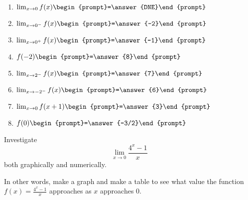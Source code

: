 \documentclass[handout]{ximera}
\begin{document}
\begin{question}
\begin{enumerate}
\item $\lim_{x\to 0} f(x) \begin{prompt}=\answer{DNE}\end{prompt}$ 
\item $\lim_{x\to 0^-} f(x) \begin{prompt}=\answer{-2}\end{prompt}$  
\item $\lim_{x\to 0^+} f(x) \begin{prompt}=\answer{-1}\end{prompt}$  
\item $f(-2) \begin{prompt}=\answer{8}\end{prompt}$  
\item $\lim_{x\to 2^-} f(x) \begin{prompt}=\answer{7}\end{prompt}$  
\item $\lim_{x\to -2^-} f(x) \begin{prompt}=\answer{6}\end{prompt}$  
\item $\lim_{x\to 0} f(x+1) \begin{prompt}=\answer{3}\end{prompt}$  
\item $f(0) \begin{prompt}=\answer{-3/2}\end{prompt}$ 
\end{enumerate}
\end{question}


\begin{question}
		Investigate  \[\lim_{x \to 0} \frac{4^x - 1}{x}\] both graphically and numerically.  
		
		In other words, make a graph and make a table to see what value the function $f(x) = \frac{4^x-1}{x}$ approaches as $x$ approaches $0$.
	\end{question}
	
	\newpage
	
\end{document}
